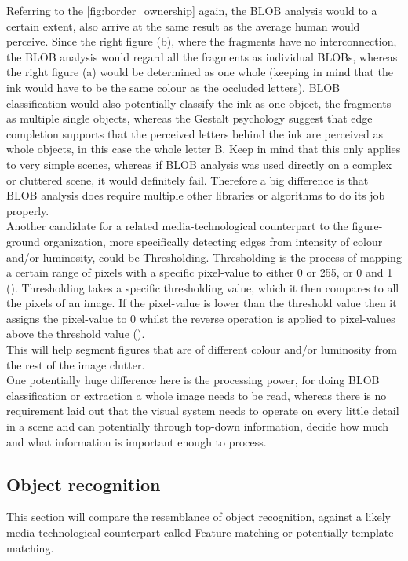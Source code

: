 \documentclass{article}
\newcommand{\goodcite}[1]{ {(\cite{#1})}}
\begin{document}
Referring to the \autoref{fig:border_ownership} again, the BLOB analysis would to a certain extent, also arrive at the same result as the average human would perceive. Since the right figure (b), where the fragments have no interconnection, the BLOB analysis would regard all the fragments as individual BLOBs, whereas the right figure (a) would be determined as one whole (keeping in mind that the ink would have to be the same colour as the occluded letters). BLOB classification would also potentially classify the ink as one object, the fragments as multiple single objects, whereas the Gestalt psychology suggest that edge completion supports that the perceived letters behind the ink are perceived as whole objects, in this case the whole letter B. Keep in mind that this only applies to very simple scenes, whereas if BLOB analysis was used directly on a complex or cluttered scene, it would definitely fail. Therefore a big difference is that BLOB analysis does require multiple other libraries or algorithms to do its job properly.\medskip\\

Another candidate for a related media-technological counterpart to the figure-ground organization, more specifically detecting edges from intensity of colour and/or luminosity, could be Thresholding. Thresholding is the process of mapping a certain range of pixels with a specific pixel-value to either 0 or 255, or 0 and 1\goodcite{IP}. Thresholding takes a specific thresholding value, which it then compares to all the pixels of an image. If the pixel-value is lower than the threshold value then it assigns the pixel-value to 0 whilst the reverse operation is applied to pixel-values above the threshold value\goodcite{IP}.\\This will help segment figures that are of different colour and/or luminosity from the rest of the image clutter.\medskip \\

One potentially huge difference here is the processing power, for doing BLOB classification or extraction a whole image needs to be read, whereas there is no requirement laid out that the visual system needs to operate on every little detail in a scene and can potentially through top-down information, decide how much and what information is important enough to process.


\subsection{Object recognition}
This section will compare the resemblance of object recognition, against a likely media-technological counterpart called Feature matching or potentially template matching.
\end{document}
